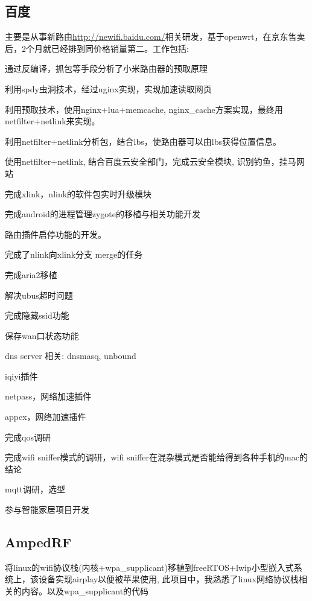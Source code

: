 \documentclass[titlepage]{article}
\begin{document}
\subsection{百度}

主要是从事新路由\url{http://newifi.baidu.com/}相关研发，基于openwrt，在京东售卖后，{\color{red}2个月就已经排到同价格销量第二}。工作包括:

\begin{compactitem}
    \item 通过反编译，抓包等手段分析了小米路由器的预取原理
    \item 利用spdy虫洞技术，经过nginx实现，实现加速读取网页
    \item 利用预取技术，使用nginx+lua+memcache, nginx\_cache方案实现，最终用netfilter+netlink来实现。
    \item 利用netfilter+netlink分析包，结合lbs，使路由器可以由lbs获得位置信息。
    \item 使用netfilter+netlink, 结合百度云安全部门，完成云安全模块, 识别钓鱼，挂马网站
    \item 完成xlink，nlink的软件包实时升级模块
    \item 完成android的进程管理zygote的移植与相关功能开发
    \item 路由插件启停功能的开发。
    \item 完成了nlink向xlink分支 merge的任务
    \item 完成aria2移植
    \item 解决ubus超时问题
    \item 完成隐藏ssid功能
    \item 保存wan口状态功能
    \item dns server 相关: dnsmasq, unbound
    \item iqiyi插件
    \item netpass，网络加速插件
    \item appex，网络加速插件
    \item 完成qos调研
    \item 完成wifi sniffer模式的调研，wifi sniffer在混杂模式是否能给得到各种手机的mac的结论
    \item mqtt调研，选型
\end{compactitem}

参与智能家居项目开发

\subsection{AmpedRF}

将linux的wifi协议栈(内核+wpa\_supplicant)移植到freeRTOS+lwip小型嵌入式系统上，该设备实现airplay以便被苹果使用, 此项目中，我熟悉了linux网络协议栈相关的内容。以及wpa\_supplicant的代码
\end{document}
